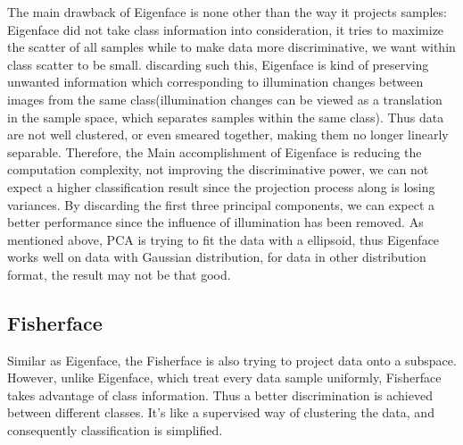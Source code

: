 \documentclass[conference]{IEEEtran}
\begin{document}
The main drawback of Eigenface is none other than the way it projects samples: Eigenface did not take class information into consideration, it tries to maximize the scatter of all samples while to make data more discriminative, we want within class scatter to be small. discarding such this, Eigenface is kind of preserving unwanted information which corresponding to illumination changes between images from the same class\cite{adini1997face}(illumination changes can be viewed as a translation in the sample space, which separates samples within the same class). Thus data are not well clustered, or even smeared together, making them no longer linearly separable. Therefore, the Main accomplishment of Eigenface is reducing the computation complexity, not improving the discriminative power, we can not expect a higher classification result since the projection process along is losing variances. By discarding the first three principal components, we can expect a better performance since the influence of illumination has been removed\cite{belhumeur1997eigenfaces}. As mentioned above, PCA is trying to fit the data with a ellipsoid, thus Eigenface works well on data with Gaussian distribution, for data in other distribution format, the result may not be that good.
\subsection{Fisherface}
Similar as Eigenface, the Fisherface is also trying to project data onto a subspace. However, unlike Eigenface, which treat every data sample uniformly, Fisherface takes advantage of class information. Thus a better discrimination is achieved between different classes. It's like a supervised way of clustering the data, and consequently classification is simplified.
\end{document}
